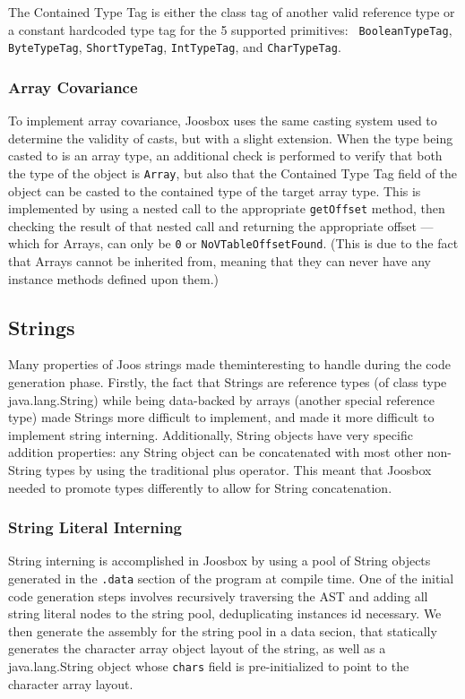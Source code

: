 \documentclass[letterpaper]{article}
\begin{document}
  The Contained Type Tag is either the class tag of another valid reference type
  or a constant hardcoded type tag for the 5 supported primitives: {\tt
  BooleanTypeTag}, {\tt ByteTypeTag}, {\tt ShortTypeTag}, {\tt IntTypeTag}, and
  {\tt CharTypeTag}.

  \subsubsection{Array Covariance}

  To implement array covariance, Joosbox uses the same casting system used to
  determine the validity of casts, but with a slight extension. When the type
  being casted to is an array type, an additional check is performed to verify
  that both the type of the object is {\tt Array}, but also that the Contained
  Type Tag field of the object can be casted to the contained type of the
  target array type. This is implemented by using a nested call to the
  appropriate {\tt getOffset} method, then checking the result of that nested
  call and returning the appropriate offset --- which for Arrays, can only be
  {\tt 0} or {\tt NoVTableOffsetFound}. (This is due to the fact that Arrays
  cannot be inherited from, meaning that they can never have any instance
  methods defined upon them.)

  \subsection{Strings}

  Many properties of Joos strings made theminteresting to handle during the
  code generation phase. Firstly, the fact that Strings are reference types
  (of class type java.lang.String) while being data-backed by arrays (another
  special reference type) made Strings more difficult to implement, and made
  it more difficult to implement string interning. Additionally, String
  objects have very specific addition properties: any String object can be
  concatenated with most other non-String types by using the traditional plus
  operator. This meant that Joosbox needed to promote types differently to
  allow for String concatenation.

  \subsubsection{String Literal Interning}

  String interning is accomplished in Joosbox by using a pool of String
  objects generated in the {\tt .data} section of the program at compile time.
  One of the initial code generation steps involves recursively traversing the
  AST and adding all string literal nodes to the string pool, deduplicating
  instances id necessary. We then generate the assembly for the string pool in
  a data secion, that statically generates the character array object layout
  of the string, as well as a java.lang.String object whose {\tt chars} field
  is pre-initialized to point to the character array layout.
\end{document}
